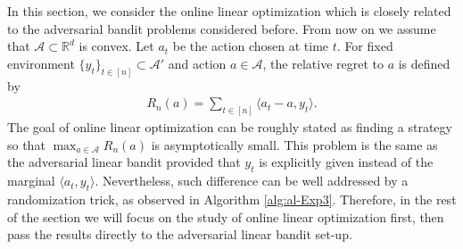 \documentclass[10pt,a4article]{amsart}
\numberwithin{equation}{section}
\theoremstyle{plain}
\theoremstyle{definition}
\def\R{{\mathbb R}}
\def\R{{\mathbb R}}
\begin{document}
In this section, we consider the online linear optimization which is closely related to the adversarial bandit problems considered before. From now on we assume that $\mathcal A\subset\R^d$ is convex. Let $a_t$ be the action chosen at time $t$. For fixed environment $\{y_t\}_{t\in [n]}\subset \mathcal A'$ and action $a\in\mathcal A$, the relative regret to $a$ is defined by 
\begin{align*}
R_n(a) = \sum_{t\in [n]}\langle a_t-a, y_t\rangle. 
\end{align*}
The goal of online linear optimization can be roughly stated as finding a strategy so that $\max_{a\in\mathcal A}R_n(a)$ is asymptotically small. This problem is the same as the adversarial linear bandit provided that $y_t$ is explicitly given instead of the marginal $\langle a_t, y_t\rangle$. Nevertheless, such difference can be well addressed by a randomization trick, as observed in Algorithm \ref{alg:al-Exp3}. Therefore, in the rest of the section we will focus on the study of online linear optimization first, then pass the results directly to the adversarial linear bandit set-up. 
\end{document}

